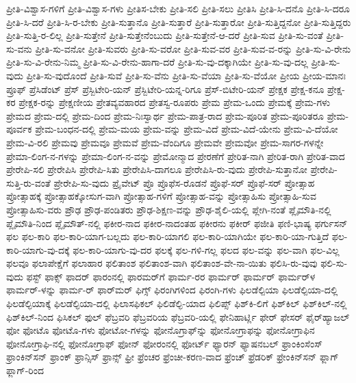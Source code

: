 {ಪ್ರೀತಿ-ವಿಶ್ವಾಸ-ಗಳಿಗೆ
ಪ್ರೀತಿ-ವಿಶ್ವಾಸ-ಗಳು
ಪ್ರೀತಿಸ-ಬೇಕು
ಪ್ರೀತಿ-ಸಲಿ
ಪ್ರೀತಿ-ಸಲು
ಪ್ರೀತಿಸಿ
ಪ್ರೀತಿ-ಸಿ-ದನೊ
ಪ್ರೀತಿ-ಸಿ-ದರೂ
ಪ್ರೀತಿ-ಸಿ-ದರೆ
ಪ್ರೀತಿ-ಸಿ-ರ-ಬೇಕು
ಪ್ರೀತಿ-ಸುತ್ತಾನೊ
ಪ್ರೀತಿ-ಸುತ್ತಾರೆ
ಪ್ರೀತಿ-ಸುತ್ತಾರೋ
ಪ್ರೀತಿ-ಸುತ್ತಿದ್ದನೋ
ಪ್ರೀತಿ-ಸುತ್ತಿದ್ದರು
ಪ್ರೀತಿ-ಸುತ್ತಿ-ರ-ಲಿಲ್ಲ
ಪ್ರೀತಿ-ಸುತ್ತೇನೆ
ಪ್ರೀತಿ-ಸುತ್ತೇನೆಂಬುದು
ಪ್ರೀತಿ-ಸುತ್ತೇನೆ-ಆ-ದರೆ
ಪ್ರೀತಿ-ಸುವ
ಪ್ರೀತಿ-ಸು-ವಂತೆ
ಪ್ರೀತಿ-ಸು-ವನು
ಪ್ರೀತಿ-ಸು-ವನೋ
ಪ್ರೀತಿ-ಸುವರು
ಪ್ರೀತಿ-ಸು-ವರೋ
ಪ್ರೀತಿ-ಸುವ-ವರ
ಪ್ರೀತಿ-ಸುವ-ವ-ರನ್ನು
ಪ್ರೀತಿ-ಸು-ವಿ-ರೇನು
ಪ್ರೀತಿ-ಸು-ವಿ-ರೇನು-ನಿಮ್ಮ
ಪ್ರೀತಿ-ಸು-ವಿ-ರೇನು-ಹಾಗಾ-ದರೆ
ಪ್ರೀತಿ-ಸು-ವು-ದಕ್ಕಾಗಿಯೇ
ಪ್ರೀತಿ-ಸು-ವು-ದಲ್ಲ
ಪ್ರೀತಿ-ಸು-ವುದು
ಪ್ರೀತಿ-ಸು-ವುದೊಂದೆ
ಪ್ರೀತಿ-ಸುವೆ
ಪ್ರೀತಿ-ಸು-ವೆನು
ಪ್ರೀತಿ-ಸು-ವೆಯಾ
ಪ್ರೀತಿ-ಸು-ವೆಯೋ
ಪ್ರೀಯ
ಪ್ರೀಯ-ಮಾನಃ
ಪ್ರೂಫ್
ಪ್ರೆಸಿಡೆಂಟ್
ಪ್ರೆಸ್
ಪ್ರೆಸ್ಬಿಟೇರಿ-ಯನ್
ಪ್ರೆಸ್ಬಿಟೇರಿ-ಯನ್ನ-ರಿಗೂ
ಪ್ರೆಸ್‌-ಬಿಟೇರಿ-ಯನ್
ಪ್ರೇಕ್ಷಕ
ಪ್ರೇಕ್ಷ-ಕನೂ
ಪ್ರೇಕ್ಷ-ಕರ
ಪ್ರೇಕ್ಷಕ-ರನ್ನು
ಪ್ರೇಕ್ಷಣೀಯ
ಪ್ರೇತವ್ಯವಹಾರದ
ಪ್ರೇತಸ್ವ-ರೂಪರು
ಪ್ರೇಮ
ಪ್ರೇಮ-ಒಂದು
ಪ್ರೇಮಕ್ಕೆ
ಪ್ರೇಮ-ಗಳು
ಪ್ರೇಮದ
ಪ್ರೇಮ-ದಲ್ಲಿ
ಪ್ರೇಮ-ದಿಂದ
ಪ್ರೇಮ-ನಿಃಸ್ವಾರ್ಥ
ಪ್ರೇಮ-ಪಾತ್ರ-ರಾದ
ಪ್ರೇಮ-ಪೂರಿತ
ಪ್ರೇಮ-ಪೂರಿತರೂ
ಪ್ರೇಮ-ಪೂರ್ವಕ
ಪ್ರೇಮ-ಬಂಧನ-ದಲ್ಲಿ
ಪ್ರೇಮ-ಮಯ
ಪ್ರೇಮ-ವನ್ನು
ಪ್ರೇಮ-ವಿದೆ
ಪ್ರೇಮ-ವಿದೆ-ಯೇನು
ಪ್ರೇಮ-ವಿ-ದೆಯೋ
ಪ್ರೇಮ-ವಿ-ರಲಿ
ಪ್ರೇಮವು
ಪ್ರೇಮವೂ
ಪ್ರೇಮವೆ
ಪ್ರೇಮ-ವೆಂದಿಗೂ
ಪ್ರೇಮವೇ
ಪ್ರೇಮವೋ
ಪ್ರೇಮ-ಸಾಗರ-ಗಳನ್ನೇ
ಪ್ರೇಮಾ-ಲಿಂಗ-ನ-ಗಳನ್ನು
ಪ್ರೇಮಾ-ಲಿಂಗ-ನ-ವನ್ನು
ಪ್ರೇಮೋನ್ಮಾದ
ಪ್ರೇರಣೆಗೆ
ಪ್ರೇರಿತ-ನಾಗಿ
ಪ್ರೇರಿತ-ರಾಗಿ
ಪ್ರೇರಿತ-ವಾದ
ಪ್ರೇರೇಪಿ-ಸಲಿ
ಪ್ರೇರೇಪಿಸಿ
ಪ್ರೇರೇಪಿ-ಸಿತು
ಪ್ರೇರೇಪಿಸಿ-ದಾಗಲೂ
ಪ್ರೇರೇಪಿಸಿ-ರು-ವುದು
ಪ್ರೇರೇಪಿ-ಸುತ್ತಾನೋ
ಪ್ರೇರೇಪಿ-ಸುತ್ತಿ-ರು-ವಂತೆ
ಪ್ರೇರೇಪಿ-ಸು-ವುದು
ಪ್ರೈವೇಟ್
ಪ್ರೊ
ಪ್ರೊಫೆಸ-ರೊಡನೆ
ಪ್ರೊಫೆ-ಸರ್
ಪ್ರೊಫೆ-ಸರ್‌
ಪ್ರೋತ್ಸಾಹ
ಪ್ರೋತ್ಸಾಹಕ್ಕೆ
ಪ್ರೋತ್ಸಾಹಕ್ಕೋಸುಗ-ವಾಗಿ
ಪ್ರೋತ್ಸಾಹ-ಗಳಿಗೆ
ಪ್ರೋತ್ಸಾಹ-ವನ್ನು
ಪ್ರೋತ್ಸಾಹಿಸು
ಪ್ರೋತ್ಸಾಹಿ-ಸುವ
ಪ್ರೋತ್ಸಾಹಿಸು-ವರು
ಪ್ರೌಢ
ಪ್ರೌಢ-ಪಂಡಿತರು
ಪ್ರೌಢ-ಶಿಕ್ಷಣ-ವನ್ನು
ಪ್ರೌಢ-ಶೈಲಿ-ಯಲ್ಲಿ
ಪ್ಲೇಗಿ-ನಂತೆ
ಪ್ಲೈಮೌತಿ-ನಲ್ಲಿ
ಪ್ಲೈಮೌತಿ-ನಿಂದ
ಪ್ಲೈಮೌತ್‌-ನಲ್ಲಿ
ಫಕೀರ-ನಾದ
ಫಕೀರ-ನಾದಂತಹ
ಫಕೀರನು
ಫಕೀರ್
ಫಜೀತಿ
ಫಣಿ-ಭಾಷ್ಯ
ಫರ್ಗುಸನ್
ಫಲ
ಫಲ-ಕಾರಿ
ಫಲ-ಕಾರಿ-ಯಾಗ-ಬಲ್ಲದು
ಫಲ-ಕಾರಿ-ಯಾಗಲಿ
ಫಲ-ಕಾರಿ-ಯಾಗಿಯೇ
ಫಲ-ಕಾರಿ-ಯಾ-ಗುತ್ತಿದೆ
ಫಲ-ಕಾರಿ-ಯಾಗು-ವು-ದಕ್ಕೆ
ಫಲ-ಕಾರಿ-ಯಾಗು-ವು-ದರ
ಫಲಕ್ಕೆ
ಫಲ-ಗಳಿ-ಗಲ್ಲ
ಫಲದ
ಫಲ-ವನ್ನು
ಫಲ-ವಾಗಿ
ಫಲ-ವಿಲ್ಲ
ಫಲವೂ
ಫಲಾಪೇಕ್ಷೆಗೆ
ಫಲಾಹಾರ
ಫಲಿತಾಂಶ
ಫಲಿತಾಂಶ-ವಾಗಿ
ಫಲಿತಾಂಶ-ವೇ-ನಾ-ಯಿತು
ಫಲಿಸಿ-ರು-ವುವು
ಫಲಿ-ಸು-ವುದು
ಫಸ್ಟ್
ಫಾಕ್ಸ್
ಫಾದರ್
ಫಾರಂನಲ್ಲಿ
ಫಾರಮರ್‌ಗೆ
ಫಾರ್ಮ-ರರ
ಫಾರ್ಮರ್
ಫಾರ್ಮರ್‌
ಫಾರ್ಮರ್‌ಳ
ಫಾರ್ಮರ್‌-ಳನ್ನು
ಫಾರ್ಮ-‌ರ್
ಫಾರ್‌ಮರ್
ಫಿಗ್ಸ್
ಫಿರಂಗಿಗಳಿಂದ
ಫಿರಂಗಿ-ಗಳು
ಫಿಲಡೆಲ್ಪಿಯಾ
ಫಿಲಡೆಲ್ಪಿಯಾ-ದಲ್ಲಿ
ಫಿಲಡೆಲ್ಫಿಯಾಕ್ಕೆ
ಫಿಲಡೆಲ್ಫಿಯಾ-ದಲ್ಲಿ
ಫಿಲಾಸಫಿಕಲ್
ಫಿಲಿಡೆಲ್ಫಿ-ಯಾದ
ಫಿಲಿಪ್ಸ್
ಫಿಶ್‌ಕಿ-ಲಿಗೆ
ಫಿಶ್‌ಕಿಲ್
ಫಿಶ್‌ಕಿಲ್‌-ನಲ್ಲಿ
ಫಿಶ್‌ಕಿಲ್‌-ನಿಂದ
ಫಿಸಿಕಲ್
ಫುಲ್
ಫೆಬ್ರವರಿ
ಫೆಬ್ರವರಿಯ
ಫೆಬ್ರವರಿ-ಯಲ್ಲಿ
ಫೇನಿಹಾರ್ಟ್ಲಿ
ಫೇರ್
ಫೇಸರ್‌
ಫೈರ್‌ಹ್ಯಾಜಲ್
ಫೋ
ಫೋಟೊ
ಫೋಟೊ-ಗಳು
ಫೋಟೋ-ಗಳನ್ನು
ಫೋನೊಗ್ರಾಫ್‌ನ್ನು
ಫೋನೋಗ್ರಾಫನ್ನು
ಫೋನೋಗ್ರಾಫಿನ
ಫೋನೋಗ್ರಾಫಿ-ನಲ್ಲಿ
ಫೋನೋಗ್ರಾಫ್
ಫೋನ್
ಫೋರಂನಲ್ಲಿ
ಫೋರ್ಟ್
ಫ್ಯಾರನ್
ಫ್ಯಾಷನಬಲ್
ಫ್ರಾಂಕಿಂಸೆಂಸ್
ಫ್ರಾಂಕಿನ್‌ಸನ್
ಫ್ರಾಂಕ್
ಫ್ರಾನ್ಸಿಸ್
ಫ್ರಾನ್ಸ್
ಫ್ರೀ
ಫ್ರೆಂಚರ
ಫ್ರೆಂಚೀ-ಕರಣ-ವಾದ
ಫ್ರೆಂಚ್
ಫ್ರೆಡರಿಕ್
ಫ್ರೇಂಕಿನ್‌ಸನ್
ಫ್ಲಾಗ್
ಫ್ಲಾಗ್‌-ರಿಂದ
}
